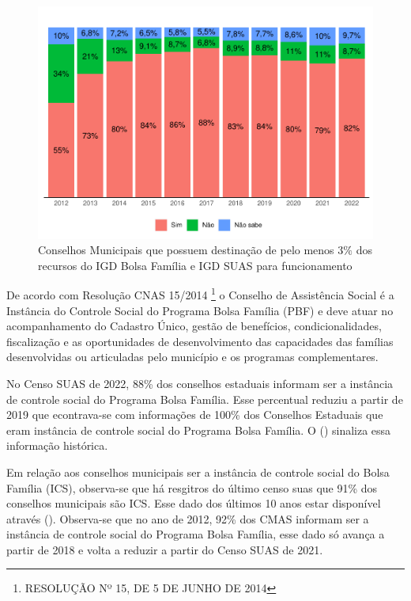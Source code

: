 \documentclass[
  brazilian]{report}
\begin{document}
\begin{figure}
\includegraphics{Censo-SUAS-2022_files/figure-latex/cmas_igd-1} \caption[Conselhos Municipais que possuem destinação de pelo menos 3$\%$ dos recursos do IGD Bolsa Família e IGD SUAS para funcionamento]{Conselhos Municipais que possuem destinação de pelo menos 3$\%$ dos recursos do IGD Bolsa Família e IGD SUAS para funcionamento}\label{fig:cmas_igd}
\end{figure}

De acordo com Resolução CNAS 15/2014
\footnote{RESOLUÇÃO Nº 15, DE 5 DE JUNHO DE 2014} o Conselho de
Assistência Social é a Instância do Controle Social do Programa Bolsa
Família (PBF) e deve atuar no acompanhamento do Cadastro Único, gestão
de benefícios, condicionalidades, fiscalização e as oportunidades de
desenvolvimento das capacidades das famílias desenvolvidas ou
articuladas pelo município e os programas complementares.

No Censo SUAS de 2022, 88\% dos conselhos estaduais informam ser a
instância de controle social do Programa Bolsa Família. Esse percentual
reduziu a partir de 2019 que econtrava-se com informações de 100\% dos
Conselhos Estaduais que eram instância de controle social do Programa
Bolsa Família. O () sinaliza essa informação
histórica.

Em relação aos conselhos municipais ser a instância de controle social
do Bolsa Família (ICS), observa-se que há resgitros do último censo suas
que 91\% dos conselhos municipais são ICS. Esse dado dos últimos 10 anos
estar disponível através (). Observa-se que no ano
de 2012, 92\% dos CMAS informam ser a instância de controle social do
Programa Bolsa Família, esse dado só avança a partir de 2018 e volta a
reduzir a partir do Censo SUAS de 2021.
\end{document}
